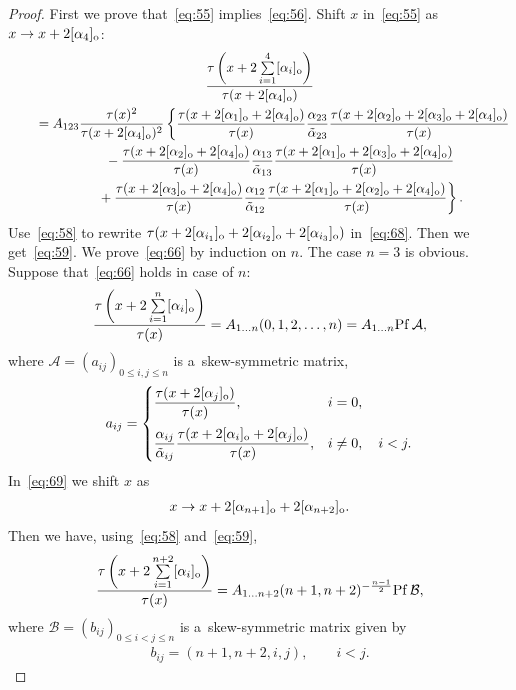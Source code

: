 \begin{proof}
First we prove that~\eqref{eq:55} implies~\eqref{eq:56}.
Shift $x$ in~\eqref{eq:55} as $x\rightarrow x+2[\alpha_4]_{\rm o}$:
\begin{gather}
\frac{\tau\left(x+2\sum\limits_{i=1}^{4}[\alpha_i]_{\rm o}\right)}{\tau(x+2[\alpha_4]_{\rm o})}\nonumber\\
\qquad{}
=A_{123}\frac{\tau(x)^2}{\tau(x+2[\alpha_4]_{\rm o})^2}\left\{\frac{\tau(x+2[\alpha_1]_{\rm o}+2[\alpha_4]_{\rm o})}{\tau(x)}
\frac{\alpha_{23}}{\tilde{\alpha}_{23}}\frac{\tau(x+2[\alpha_2]_{\rm o}+2[\alpha_3]_{\rm o}+2[\alpha_4]_{\rm o})}{\tau(x)}
\right.
\nonumber
\\
\qquad\quad{} -\frac{\tau(x+2[\alpha_2]_{\rm o}+2[\alpha_4]_{\rm o})}{\tau(x)}\frac{\alpha_{13}}{\tilde{\alpha}_{13}}
\frac{\tau(x+2[\alpha_1]_{\rm o}+2[\alpha_3]_{\rm o}+2[\alpha_4]_{\rm o})}{\tau(x)}\nonumber
\\
 \left.
 \qquad\quad{} +\frac{\tau(x+2[\alpha_3]_{\rm o}+2[\alpha_4]_{\rm o})}{\tau(x)}\frac{\alpha_{12}}{\tilde{\alpha}_{12}}
\frac{\tau(x+2[\alpha_1]_{\rm o}+2[\alpha_2]_{\rm o}+2[\alpha_4]_{\rm o})}{\tau(x)}\right\}.
\label{eq:68}
\end{gather}
Use~\eqref{eq:58} to rewrite $\tau(x+2[\alpha_{i_1}]_{\rm o}+2[\alpha_{i_2}]_{\rm o}+2[\alpha_{i_3}]_{\rm o})$
in~\eqref{eq:68}.
Then we get~\eqref{eq:59}.
We prove~\eqref{eq:66} by induction on $n$.
The case $n=3$ is obvious.
Suppose that~\eqref{eq:66} holds in case of $n$:
\begin{gather}
\frac{\tau\left(x+2\sum\limits_{i=1}^{n}[\alpha_i]_{\rm o}\right)}{\tau(x)}=A_{1\dots n}(0,1,2,\dots,n)=A_{1\dots n}{\rm Pf}\, {\mathcal A},
\label{eq:69}
\end{gather}
where ${\mathcal A}=(a_{ij})_{0\le i,j\le n}$ is a~skew-symmetric matrix,
\begin{gather*}%
a_{ij}=
\begin{cases}\dfrac{\tau(x+2[\alpha_j]_{\rm o})}{\tau(x)}, &  i=0,
\vspace{2mm}\\
\dfrac{\alpha_{ij}}{{\tilde{\alpha}}_{ij}}\dfrac{\tau(x+2[\alpha_i]_{\rm o}+2[\alpha_j]_{\rm o})}{\tau(x)}
,&  i\neq0,\quad  i<j.
\end{cases}
\end{gather*}
In~\eqref{eq:69} we shift $x$ as
\begin{gather*}
x\rightarrow x+2[\alpha_{n+1}]_{\rm o}+2[\alpha_{n+2}]_{\rm o}.
\end{gather*}
Then we have, using~\eqref{eq:58} and~\eqref{eq:59},
\begin{gather}
\frac{\tau\left(x+2\sum\limits_{i=1}^{n+2}[\alpha_i]_{\rm o}\right)}{\tau(x)}=A_{1\dots n+2}(n+1,n+2)^{-\frac{n-1}{2}}{\rm Pf}\,
{\mathcal B},
\label{eq:71}
\end{gather}
where ${\mathcal B}=(b_{ij})_{0\le i<j\le n}$ is a~skew-symmetric matrix given by
\begin{gather*}%
b_{ij}=(n+1,n+2,i,j),\qquad  i<j .
\end{gather*}


\end{proof}
